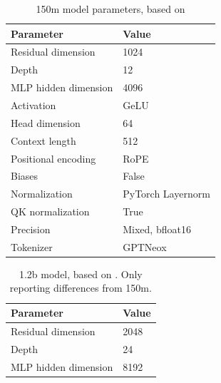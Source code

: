 \documentclass{article}
\begin{document}
\begin{table}[h]
        \caption{150m model parameters, based on \cite{wortsman2024smallscale, groeneveld2024olmo}}
        \label{tab:150m-hyper}
        \centering
    \begin{tabular}{l|l}
    \toprule
        Parameter & Value \\
        \midrule
         Residual dimension & 1024\\
         Depth & 12 \\
         MLP hidden dimension & 4096\\
         Activation & GeLU\\
         Head dimension & 64\\
         Context length & 512\\
         Positional encoding & RoPE\\
         Biases & False\\
         Normalization & PyTorch Layernorm\\
         QK normalization & True\\
         Precision & Mixed, bfloat16\\
         Tokenizer & GPTNeox\\
         \bottomrule
    \end{tabular}
\end{table}

\begin{table}[h]
    \caption{1.2b model, based on \cite{wortsman2024smallscale, groeneveld2024olmo}. Only reporting differences from 150m.}
    \label{tab:1.2b-hyper}
    \centering
    \begin{tabular}{l|l}
    \toprule
        Parameter & Value \\
        \midrule
         Residual dimension & 2048\\
         Depth & 24 \\
         MLP hidden dimension & 8192\\
         \bottomrule
    \end{tabular}
\end{table}
\end{document}
